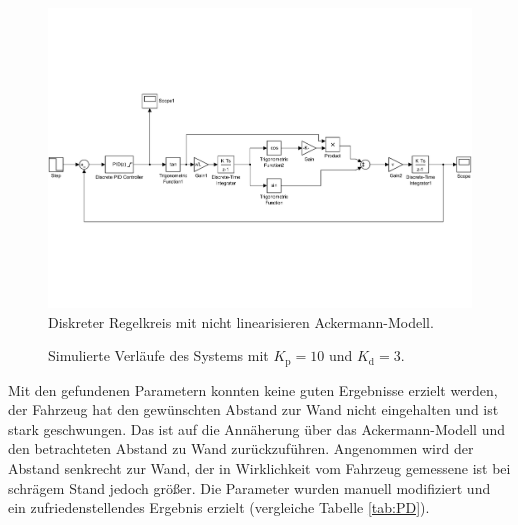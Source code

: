 \begin{figure}[h]
	\centering
	\includegraphics[width=0.9\linewidth,trim=0cm 6cm 0cm 6cm, clip]{pics/system.pdf}
	\caption{Diskreter Regelkreis mit nicht linearisieren Ackermann-Modell.}
	\label{fig:regelkreis}
\end{figure}
\begin{figure}
	\centering
	\caption{Simulierte Verl\"aufe des Systems mit $K_\text{p}=10$ und $K_\text{d}=3$.}
	\label{fig:Simulink}
\end{figure}

Mit den gefundenen Parametern konnten keine guten Ergebnisse erzielt werden, der Fahrzeug hat den gew\"unschten Abstand zur Wand nicht eingehalten und ist stark geschwungen. Das ist auf die Ann\"aherung \"uber das Ackermann-Modell und den betrachteten Abstand zu Wand zur\"uckzuf\"uhren. Angenommen wird der Abstand senkrecht zur Wand, der in Wirklichkeit vom Fahrzeug gemessene ist bei schr\"agem Stand jedoch gr\"o\ss{}er. Die Parameter wurden manuell modifiziert und ein zufriedenstellendes Ergebnis erzielt (vergleiche Tabelle \ref{tab:PD}).

